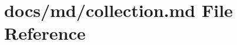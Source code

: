 \hypertarget{collection_8md}{}\section{docs/md/collection.md File Reference}
\label{collection_8md}
